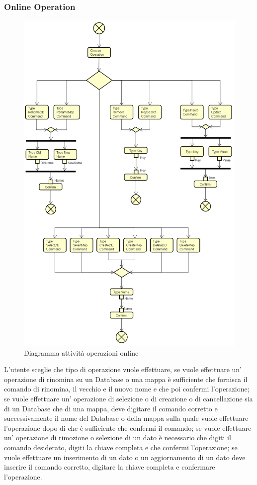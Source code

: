 \documentclass[a4paper]{article}
\begin{document}
		\subsubsection{Online Operation}
			\begin{figure} [H]
				\centering
				\includegraphics[scale=0.4]{ST/client/diagramma-Online-Operation.png}
				\caption{Diagramma attività operazioni online}
			\end{figure}
				L'utente sceglie che tipo di operazione vuole effettuare, se vuole effettuare un' operazione di rinomina su un Database o una mappa è sufficiente che fornisca il comando di rinomina, il vecchio e il nuovo nome e che poi confermi l'operazione; se vuole effettuare un' operazione di selezione o di creazione o di cancellazione sia di un Database che di una mappa, deve digitare il comando corretto e successivamente il nome del Database o della mappa sulla quale vuole effettuare l'operazione dopo di che è sufficiente che confermi il comando; se vuole effettuare un' operazione di rimozione o selezione di un dato è necessario che digiti il comando desiderato, digiti la chiave completa e che confermi l'operazione; se vuole effettuare un inserimento di un dato o un aggiornamento di un dato deve inserire il comando corretto, digitare la chiave completa e confermare l'operazione.
                
\end{document}
